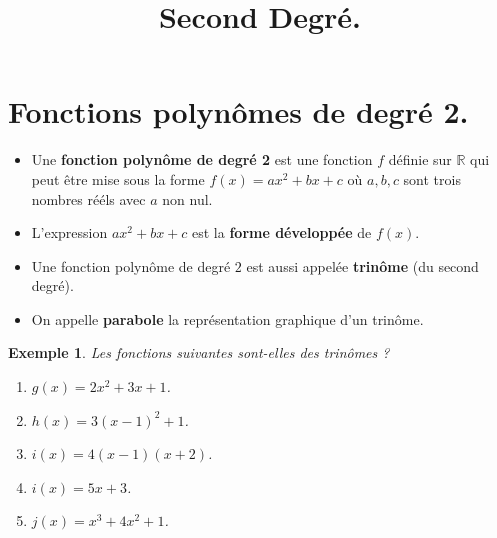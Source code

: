\documentclass[a4paper,11pt]{article}
\title{Second Degré.}
\author{}
\date{}
\theoremstyle{break}
\newtheorem{exemple}{Exemple}
\begin{document}
 
  \maketitle


  
  \section{Fonctions polynômes de degré 2.}
  
  
  \begin{definition}
    \begin{itemize}
     \item Une \textbf{fonction polynôme de degré 2} est une fonction $f$ définie sur $\mathbb{R}$
    qui peut être mise sous la forme $f(x)=ax^2+bx+c$ où $a,b,c$ sont trois nombres 
    rééls avec $a$ non nul.
     
     \item L'expression $ax^2+bx+c$ est la \textbf{forme développée} de $f(x)$.
     \item Une fonction polynôme de degré $2$ est aussi appelée 
     \textbf{trinôme} (du second degré).
     \item On appelle \textbf{parabole} la représentation graphique 
     d'un trinôme.
   \end{itemize}    
  \end{definition}
  
  
  
  \begin{exemple}
    Les fonctions suivantes sont-elles des trinômes ?
    \begin{enumerate}
     \item $g(x)=2x^2+3x+1$. 
     \item $h(x)=3(x-1)^2+1$.
     \item $i(x)=4(x-1)(x+2)$.
     \item $i(x)=5x+3$.
     \item $j(x)=x^3+4x^2+1$.
     \end{enumerate}
 
 \end{exemple}
  
\end{document}
